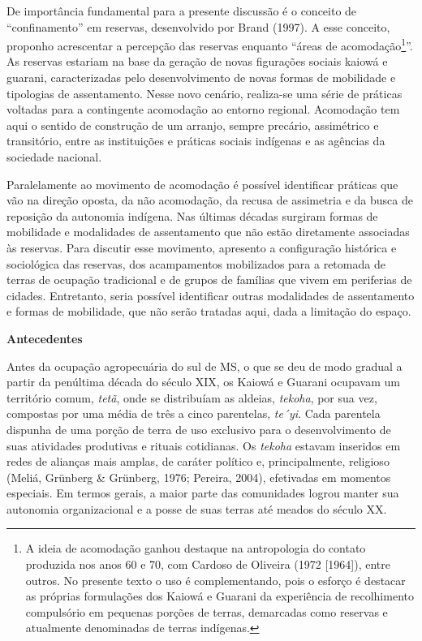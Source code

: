 De importância fundamental para a presente discussão é o conceito de
``confinamento'' em reservas, desenvolvido por Brand (1997). A esse
conceito, proponho acrescentar a percepção das reservas enquanto ``áreas
de acomodação\footnote{A ideia de acomodação ganhou destaque na
  antropologia do contato produzida nos anos 60 e 70, com Cardoso de
  Oliveira (1972 {[}1964{]}), entre outros. No presente texto o uso é
  complementando, pois o esforço é destacar as próprias formulações dos
  Kaiowá e Guarani da experiência de recolhimento compulsório em
  pequenas porções de terras, demarcadas como reservas e atualmente
  denominadas de terras indígenas.}''. As reservas estariam na base da
geração de novas figurações sociais kaiowá e guarani, caracterizadas
pelo desenvolvimento de novas formas de mobilidade e tipologias de
assentamento. Nesse novo cenário, realiza-se uma série de práticas
voltadas para a contingente acomodação ao entorno regional. Acomodação
tem aqui o sentido de construção de um arranjo, sempre precário,
assimétrico e transitório, entre as instituições e práticas sociais
indígenas e as agências da sociedade nacional.

Paralelamente ao movimento de acomodação é possível identificar práticas
que vão na direção oposta, da não acomodação, da recusa de assimetria e
da busca de reposição da autonomia indígena. Nas últimas décadas
surgiram formas de mobilidade e modalidades de assentamento que não
estão diretamente associadas às reservas. Para discutir esse movimento,
apresento a configuração histórica e sociológica das reservas, dos
acampamentos mobilizados para a retomada de terras de ocupação
tradicional e de grupos de famílias que vivem em periferias de cidades.
Entretanto, seria possível identificar outras modalidades de
assentamento e formas de mobilidade, que não serão tratadas aqui, dada a
limitação do espaço.

\textbf{Antecedentes}

Antes da ocupação agropecuária do sul de MS, o que se deu de modo
gradual a partir da penúltima década do século XIX, os Kaiowá e Guarani
ocupavam um território comum, \emph{tetã}, onde se distribuíam as
aldeias, \emph{tekoha}, por sua vez, compostas por uma média de três a
cinco parentelas, \emph{te´yi}. Cada parentela dispunha de uma porção de
terra de uso exclusivo para o desenvolvimento de suas atividades
produtivas e rituais cotidianas. Os \emph{tekoha} estavam inseridos em
redes de alianças mais amplas, de caráter político e, principalmente,
religioso (Meliá, Grünberg \& Grünberg, 1976; Pereira, 2004), efetivadas
em momentos especiais. Em termos gerais, a maior parte das comunidades
logrou manter sua autonomia organizacional e a posse de suas terras até
meados do século XX.


